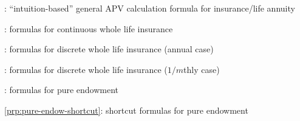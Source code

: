 \item {}: ``intuition-based'' general APV calculation formula for insurance/life annuity
\item {}: formulas for continuous whole life insurance
\item {}: formulas for discrete whole life insurance (annual case)
\item {}: formulas for discrete whole life insurance (\(1/m\)thly case)
\item {}: formulas for pure endowment
\item \cref{prp:pure-endow-shortcut}: shortcut formulas for pure endowment
